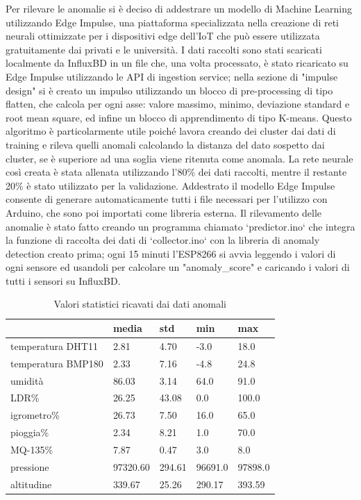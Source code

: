 \documentclass[a4paper, 12pt]{report}
\begin{document}
Per rilevare le anomalie si è deciso di addestrare un modello di Machine Learning utilizzando Edge Impulse\cite{edgeimpulse}, una piattaforma specializzata nella creazione di reti neurali ottimizzate per i dispositivi edge dell'IoT che
può essere utilizzata gratuitamente dai privati e le università. I dati raccolti sono stati scaricati localmente da InfluxBD in un file che, una volta processato, è stato ricaricato su Edge Impulse utilizzando le API di 
ingestion service\cite{eiapi}; nella sezione di "impulse design" si è creato un impulso utilizzando un blocco di pre-processing di tipo flatten, che calcola per ogni asse: valore massimo, 
minimo, deviazione standard e root mean square, ed infine un blocco di apprendimento di tipo K-means. Questo algoritmo è particolarmente utile poiché lavora creando dei cluster dai dati di training e rileva quelli anomali
calcolando la distanza del dato sospetto dai cluster, se è superiore ad una soglia viene ritenuta come anomala.
La rete neurale così creata è stata allenata utilizzando l'80\% dei dati raccolti, mentre il restante 20\% è stato utilizzato per la validazione. Addestrato il modello Edge Impulse consente di generare automaticamente
tutti i file necessari per l'utilizzo con Arduino, che sono poi importati come libreria esterna. Il rilevamento delle anomalie è stato fatto creando un programma chiamato `predictor.ino` che integra la funzione di raccolta 
dei dati di `collector.ino` con la libreria di anomaly detection creato prima; ogni 15 minuti l'ESP8266 si avvia leggendo i valori di ogni sensore ed usandoli per calcolare un "anomaly\_score" e caricando i valori di tutti i 
sensori su InfluxBD.

\begin{table}
  \centering
  \begin{tabular}{ l l l l l }
    \hline
     & media & std & min & max \\
    \hline
    temperatura DHT11 & 2.81 & 4.70 & -3.0 & 18.0 \\
    temperatura BMP180 & 2.33 & 7.16 & -4.8 & 24.8 \\
    umidità & 86.03 & 3.14 & 64.0 & 91.0 \\
    LDR\% & 26.25 & 43.08 & 0.0 & 100.0 \\
    igrometro\% & 26.73 & 7.50 & 16.0 & 65.0 \\
    pioggia\% & 2.34 & 8.21 & 1.0 & 70.0 \\
    MQ-135\% & 7.87 & 0.47 & 3.0 & 8.0 \\
    pressione & 97320.60 & 294.61 & 96691.0 & 97898.0 \\
    altitudine & 339.67 & 25.26 & 290.17 & 393.59 \\
    \hline
  \end{tabular}
  \caption{Valori statistici ricavati dai dati anomali}
  \label{tab:anomalies}
\end{table}
\end{document}
